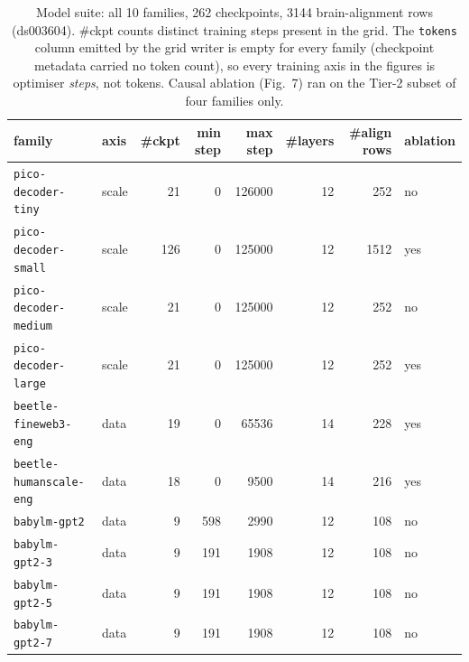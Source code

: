 \begin{table}
\caption{Model suite: all 10 families, 262 checkpoints, 3144 brain-alignment rows (ds003604). \#ckpt counts distinct training steps present in the grid. The \texttt{tokens} column emitted by the grid writer is empty for every family (checkpoint metadata carried no token count), so every training axis in the figures is optimiser \emph{steps}, not tokens. Causal ablation (Fig.~7) ran on the Tier-2 subset of four families only.}
\label{tab:model_suite}
\begin{tabular}{llrrrrrl}
\toprule
family & axis & \#ckpt & min step & max step & \#layers & \#align rows & ablation \\
\midrule
\texttt{pico-decoder-tiny} & scale & 21 & 0 & 126000 & 12 & 252 & no \\
\texttt{pico-decoder-small} & scale & 126 & 0 & 125000 & 12 & 1512 & yes \\
\texttt{pico-decoder-medium} & scale & 21 & 0 & 125000 & 12 & 252 & no \\
\texttt{pico-decoder-large} & scale & 21 & 0 & 125000 & 12 & 252 & yes \\
\texttt{beetle-fineweb3-eng} & data & 19 & 0 & 65536 & 14 & 228 & yes \\
\texttt{beetle-humanscale-eng} & data & 18 & 0 & 9500 & 14 & 216 & yes \\
\texttt{babylm-gpt2} & data & 9 & 598 & 2990 & 12 & 108 & no \\
\texttt{babylm-gpt2-3} & data & 9 & 191 & 1908 & 12 & 108 & no \\
\texttt{babylm-gpt2-5} & data & 9 & 191 & 1908 & 12 & 108 & no \\
\texttt{babylm-gpt2-7} & data & 9 & 191 & 1908 & 12 & 108 & no \\
\bottomrule
\end{tabular}
\end{table}
